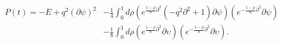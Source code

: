 \begin{equation}
\label{pres}
\begin{split}
P(t)=-E+q^2 (\partial  \psi)^2&-\frac14 \int_0^1 d\rho(
e^{\frac{1-\rho}{8}{\partial}^2}( -q^2{\partial}^2+1)\partial\psi)
  ( e^{-\frac{1-\rho}{8}{\partial}^2}\partial  \psi )\\
&-\frac18 \int_0^1 d\rho( e^{\frac{1-\rho}{8}
{\partial}^2}\partial \upsilon  )(
e^{-\frac{1-\rho}{8}{\partial}^2} \partial\upsilon).
\end{split}
\end{equation}

